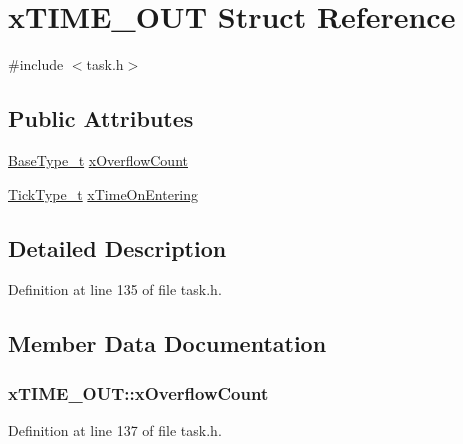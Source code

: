 \hypertarget{structx_t_i_m_e___o_u_t}{}\section{x\+T\+I\+M\+E\+\_\+\+O\+UT Struct Reference}
\label{structx_t_i_m_e___o_u_t}


{\ttfamily \#include $<$task.\+h$>$}

\subsection*{Public Attributes}
\begin{DoxyCompactItemize}
\item 
\hyperlink{portmacro_8h_a46fb21e00ae0729d7515c0fbf2269796}{Base\+Type\+\_\+t} \hyperlink{structx_t_i_m_e___o_u_t_a9289c6f97096a9b3e3fc705d0bc5a160}{x\+Overflow\+Count}
\item 
\hyperlink{portmacro_8h_aa69c48c6e902ce54f70886e6573c92a9}{Tick\+Type\+\_\+t} \hyperlink{structx_t_i_m_e___o_u_t_a3464939ca050f7bcc6ffe0d8d3766337}{x\+Time\+On\+Entering}
\end{DoxyCompactItemize}


\subsection{Detailed Description}


Definition at line 135 of file task.\+h.



\subsection{Member Data Documentation}
\subsubsection[{\texorpdfstring{x\+Overflow\+Count}{xOverflowCount}}]{ x\+T\+I\+M\+E\+\_\+\+O\+U\+T\+::x\+Overflow\+Count}\hypertarget{structx_t_i_m_e___o_u_t_a9289c6f97096a9b3e3fc705d0bc5a160}{}\label{structx_t_i_m_e___o_u_t_a9289c6f97096a9b3e3fc705d0bc5a160}


Definition at line 137 of file task.\+h.

